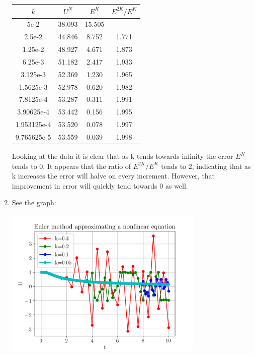 \documentclass{article}
\begin{document}
\begin{enumerate}
        \begin{center}
            \begin{tabular}{| c | c | c | c |}
                \hline
                $k$ & $U^N$ & $E^K$ & $E^{2K}/E^K$ \\
                \hline
                5e-2 & 38.093 & 15.505 & -- \\
                2.5e-2 & 44.846 & 8.752 & 1.771 \\
                1.25e-2 & 48.927 & 4.671 & 1.873 \\
                6.25e-3 & 51.182 & 2.417 & 1.933 \\
                3.125e-3 & 52.369 & 1.230 & 1.965 \\
                1.5625e-3 & 52.978 & 0.620 & 1.982 \\
                7.8125e-4 & 53.287 & 0.311 & 1.991 \\
                3.90625e-4 & 53.442 & 0.156 & 1.995 \\
                1.953125e-4 & 53.520 & 0.078 & 1.997 \\
                9.765625e-5 & 53.559 & 0.039 & 1.998 \\
                \hline
            \end{tabular}
        \end{center}
        Looking at the data it is clear that as k tends towards infinity the error $E^N$ tends to 0.
        It appears that the ratio of $E^{2K}/E^K$ tends to 2, indicating that as k increases the error will halve on every increment. However, that improvement in error will quickly tend towards 0 as well.
    \item
        See the graph: \\
        \begin{center}
            \includegraphics[width=0.75\textwidth]{q6.png}
        \end{center}
\end{enumerate}
\end{document}
